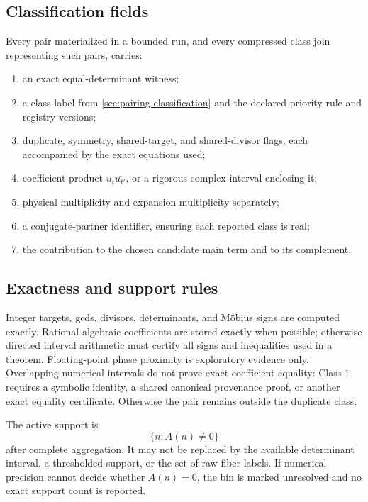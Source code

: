 \subsection{Classification fields}

Every pair materialized in a bounded run, and every compressed class
join representing such pairs, carries:
\begin{enumerate}[leftmargin=2.2em]
 \item an exact equal-determinant witness;
 \item a class label from \cref{sec:pairing-classification} and the
 declared priority-rule and registry versions;
 \item duplicate, symmetry, shared-target, and shared-divisor flags,
 each accompanied by the exact equations used;
 \item coefficient product \(u_t\overline{u_{t'}}\), or a rigorous
 complex interval enclosing it;
 \item physical multiplicity and expansion multiplicity separately;
 \item a conjugate-partner identifier, ensuring each reported class
 is real;
 \item the contribution to the chosen candidate main term and to its
 complement.
\end{enumerate}

\subsection{Exactness and support rules}

Integer targets, gcds, divisors, determinants, and M\"obius signs are
computed exactly.  Rational algebraic coefficients are stored
exactly when possible; otherwise directed interval arithmetic must
certify all signs and inequalities used in a theorem.  Floating-point
phase proximity is exploratory evidence only.  Overlapping numerical
intervals do not prove exact coefficient equality: Class \(1\)
requires a symbolic identity, a shared canonical provenance proof, or
another exact equality certificate.  Otherwise the pair remains
outside the duplicate class.

The active support is
\[
 \{n:A(n)\ne0\}
\]
after complete aggregation.  It may not be replaced by the available
determinant interval, a thresholded support, or the set of raw fiber
labels.  If numerical precision cannot decide whether \(A(n)=0\), the
bin is marked unresolved and no exact support count is reported.

